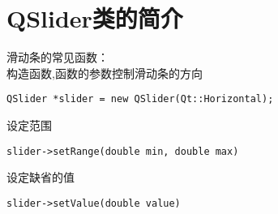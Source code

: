 \chapter{QSlider类的简介}
\noindent{}滑动条的常见函数：\\
构造函数,函数的参数控制滑动条的方向
{\color{red}\begin{verbatim}QSlider *slider = new QSlider(Qt::Horizontal);\end{verbatim}}
\noindent{}设定范围
{\color{red}\begin{verbatim}slider->setRange(double min, double max)\end{verbatim}}
\noindent{}设定缺省的值
{\color{red}\begin{verbatim}slider->setValue(double value)\end{verbatim}}
